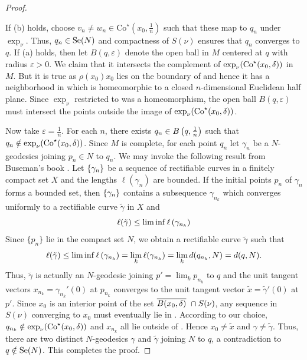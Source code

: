 \begin{proof}
\begin{enumerate}[(a)]
    \end{enumerate}
    If (b) holds, choose $v_n\neq w_n\in \mathrm{Co}^\star(x_0,\frac{1}{n})$ such that these map to $q_n$ under $\exp_\nu$. Thus,  $q_n\in \mathrm{Se}(N)$ and compactness of $S(\nu)$ ensures that $q_n$ converges to $q$. If (a) holds, then let $B(q,\varepsilon)$ denote the open ball in $M$ centered at $q$ with radius $\varepsilon>0$. We claim that it intersects the complement of $\exp_\nu(\mathrm{Co}^\star(x_0,\delta)~\!\!)$ in $M$. But it is true as $\rho(x_0)x_0$ lies on the boundary of \costar and hence it has a neighborhood in \costar which is homeomorphic to a closed $n$-dimensional Euclidean half plane. Since $\exp_{\nu}$ restricted to \costar was a homeomorphism, the open ball $B(q,\varepsilon)$ must intersect the points outside the image of $\exp_{\nu}(\mathrm{Co}^\star(x_0,\delta)~\!\!)$. 

    \vspace{0.2cm}
    \hf Now take $\varepsilon = \frac{1}{n}$. For each $n$, there exists $q_{n}\in B\left( q,\frac{1}{n} \right)$ such that $q_{n}\notin \exp_{\nu}(\mathrm{Co}^\star(x_0,\delta)~\!\!)$. Since $M$ is complete, for each point $q_{n}$ let $\gamma_{n}$ be a $N$-geodesics joining $p_n\in N$ to $q_{n}$. We may invoke the following result from Buseman's book \cite[Theorem 5.16, page 24]{Bus55}. Let $\left\{ \gamma_{n} \right\}$ be a sequence of rectifiable curves in a finitely compact set $X$ and the lengths $\ell(\gamma_n)$ are bounded. If the initial points $p_{n}$ of $\gamma_{n}$ forms a bounded set, then $\left\{ \gamma_n \right\}$ contains a subsequence $\gamma_{n_k}$ which converges uniformly to a rectifiable curve $\tilde{\gamma}$ in $X$ and 
    \begin{equation*}\label{Fact A eqn: 1} 
        \ell(\tilde{\gamma}) \le \lim\inf \ell\left( \gamma_{n_k} \right)
    \end{equation*}
    Since $\{p_n\}$ lie in the compact set $N$, we obtain a rectifiable curve $\tilde{\gamma}$ such that 
    \begin{displaymath}
        \ell(\tilde{\gamma})\leq  \lim\inf \ell\left( \gamma_{n_k} \right)=\lim_k \ell(\gamma_{n_k})=\lim_k d(q_{n_k},N)=d(q,N).
    \end{displaymath}
    Thus, $\tilde{\gamma}$ is actually an $N$-geodesic joining $p'=\lim_k p_{n_k}$ to $q$  and the unit tangent vectors $x_{n_k}=\gamma_{n_k}'(0)$ at $p_{n_k}$ converges to the unit tangent vector $\tilde{x}=\tilde{\gamma}'(0)$ at $p'$.  Since $x_{0}$ is an interior point of the set $\overline{B(x_0,\delta)}~\cap S(\nu)$, any sequence in $S(\nu)$ converging to $x_{0}$ must eventually lie in \co\!. According to our choice, $q_{n_k}\notin \exp_{\nu}(\mathrm{Co}^\star(x_0,\delta)~\!\!)$ and $x_{n_k}$ all lie outside of \co\!. Hence $x_{0}\neq \tilde{x}$ and $\gamma \neq \tilde{\gamma}$. Thus, there are two distinct $N$-geodesics $\gamma$ and $\tilde{\gamma}$ joining $N$ to $q$, a contradiction to $q\notin \mathrm{Se}(N)$. This completes the proof.
\end{proof}

